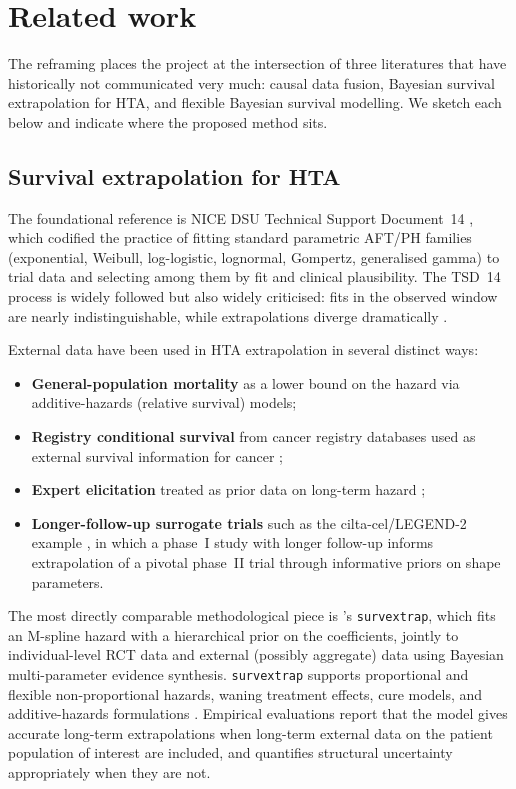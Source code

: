 \documentclass[11pt]{article}
\theoremstyle{plain}
\theoremstyle{definition}
\theoremstyle{remark}
\newcommand{\1}{\mathds{1}}
\begin{document}
\section{Related work}

The reframing places the project at the intersection of three literatures
that have historically not communicated very much: causal data fusion,
Bayesian survival extrapolation for HTA, and flexible Bayesian survival
modelling. We sketch each below and indicate where the proposed method sits.

\subsection{Survival extrapolation for HTA}

The foundational reference is NICE DSU Technical Support Document~14
\citep{Latimer2013}, which codified the practice of fitting standard
parametric AFT/PH families (exponential, Weibull, log-logistic, lognormal,
Gompertz, generalised gamma) to trial data and selecting among them by
fit and clinical plausibility. The TSD~14 process is widely followed but
also widely criticised: fits in the observed window are nearly
indistinguishable, while extrapolations diverge dramatically
\citep{BellGorrod2019, Bagust2014}.

External data have been used in HTA extrapolation in several distinct ways:
\begin{itemize}[leftmargin=*]
  \item \textbf{General-population mortality} as a lower bound on the
        hazard via additive-hazards (relative survival) models;
  \item \textbf{Registry conditional survival} from cancer registry
        databases used as external survival information for cancer
        \citep{Guyot2017};
  \item \textbf{Expert elicitation} treated as prior data on long-term hazard
        \citep{Guyot2017};
  \item \textbf{Longer-follow-up surrogate trials} such as the
        cilta-cel/LEGEND-2 example \citep{Vyas2023}, in which a phase~I
        study with longer follow-up informs extrapolation of a pivotal
        phase~II trial through informative priors on shape parameters.
\end{itemize}

The most directly comparable methodological piece is \citet{Jackson2023}'s
\texttt{survextrap}, which fits an M-spline hazard with a hierarchical prior
on the coefficients, jointly to individual-level RCT data and external
(possibly aggregate) data using Bayesian multi-parameter evidence synthesis.
\texttt{survextrap} supports proportional and flexible non-proportional
hazards, waning treatment effects, cure models, and additive-hazards
formulations \citep{Jackson2023}. Empirical evaluations
\citep{Timmins2025} report that the model gives accurate long-term
extrapolations when long-term external data on the patient population of
interest are included, and quantifies structural uncertainty appropriately
when they are not.
\end{document}
